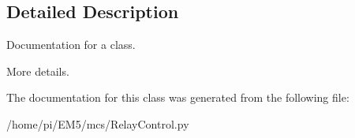 \subsection{Detailed Description}
Documentation for a class. 

More details. 

The documentation for this class was generated from the following file\+:\begin{DoxyCompactItemize}
\item 
/home/pi/\+E\+M5/mcs/Relay\+Control.\+py\end{DoxyCompactItemize}
